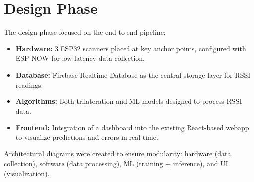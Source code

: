 \documentclass[a4paper,12pt]{report}
\begin{document}
\section{Design Phase}
The design phase focused on the end-to-end pipeline:
\begin{itemize}
    \item \textbf{Hardware:} 3 ESP32 scanners placed at key anchor points, configured with ESP-NOW for low-latency data collection.
    \item \textbf{Database:} Firebase Realtime Database as the central storage layer for RSSI readings.
    \item \textbf{Algorithms:} Both trilateration and ML models designed to process RSSI data.
    \item \textbf{Frontend:} Integration of a dashboard into the existing React-based webapp to visualize predictions and errors in real time.
\end{itemize}

Architectural diagrams were created to ensure modularity: hardware (data collection), software (data processing), ML (training + inference), and UI (visualization).  
\end{document}

